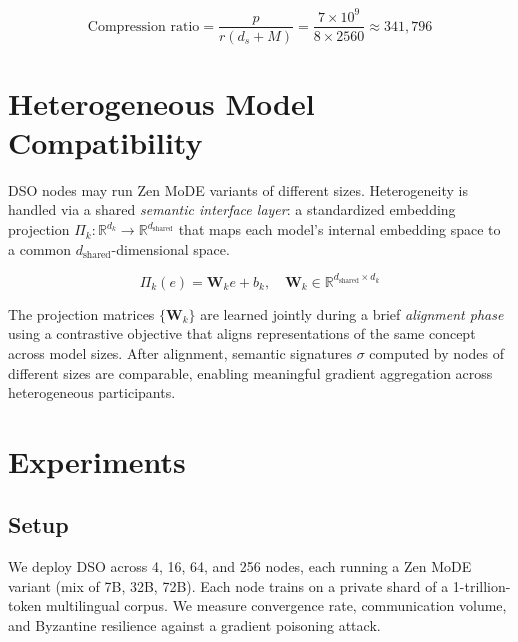 \documentclass[11pt,a4paper]{article}
\begin{document}
\begin{equation}
    \text{Compression ratio} = \frac{p}{r(d_s + M)} = \frac{7 \times 10^9}{8 \times 2560}
    \approx 341{,}796
    \label{eq:compression}
\end{equation}

\section{Heterogeneous Model Compatibility}
\label{sec:heterogeneous}

DSO nodes may run Zen MoDE variants of different sizes. Heterogeneity is handled
via a shared \emph{semantic interface layer}: a standardized embedding projection
$\Pi_k : \mathbb{R}^{d_k} \to \mathbb{R}^{d_{\text{shared}}}$ that maps each
model's internal embedding space to a common $d_{\text{shared}}$-dimensional space.

\begin{equation}
    \Pi_k(e) = \mathbf{W}_k e + b_k, \quad \mathbf{W}_k \in \mathbb{R}^{d_{\text{shared}} \times d_k}
    \label{eq:projection}
\end{equation}

The projection matrices $\{\mathbf{W}_k\}$ are learned jointly during a brief
\emph{alignment phase} using a contrastive objective that aligns representations of
the same concept across model sizes. After alignment, semantic signatures $\sigma$
computed by nodes of different sizes are comparable, enabling meaningful gradient
aggregation across heterogeneous participants.

\section{Experiments}
\label{sec:experiments}

\subsection{Setup}

We deploy DSO across 4, 16, 64, and 256 nodes, each running a Zen MoDE variant
(mix of 7B, 32B, 72B). Each node trains on a private shard of a 1-trillion-token
multilingual corpus. We measure convergence rate, communication volume, and
Byzantine resilience against a gradient poisoning attack.
\end{document}
